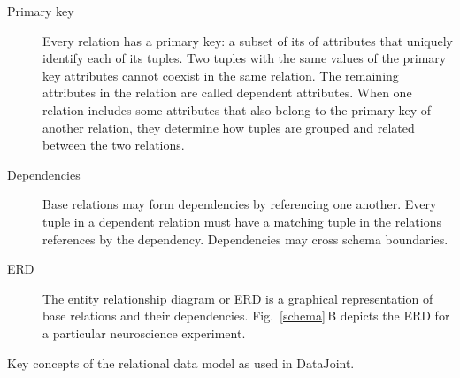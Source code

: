 \begin{table}
\begin{boxedminipage}{\textwidth}
\begin{description}
\item[Primary key] Every relation has a primary key: a subset of its of attributes that uniquely identify each of its tuples. 
Two tuples with the same values of the primary key attributes cannot coexist in the same relation.
The remaining attributes in the relation are called dependent attributes. 
When one relation includes some attributes that also belong to the primary key of another relation, they determine how tuples are grouped and related between the two relations.

\item[Dependencies]
Base relations may form dependencies by referencing one another. 
Every tuple in a dependent relation must have a matching tuple in the relations references by the dependency. 
Dependencies may cross schema boundaries.

\item[ERD]
The entity relationship diagram or ERD is a graphical representation of base relations and their dependencies.
Fig.\ \ref{schema}\,B depicts the ERD for a particular neuroscience experiment. 
\end{description}
\end{boxedminipage}
\caption{Key concepts of the relational data model as used in DataJoint.}
\label{glossary}
\end{table}
